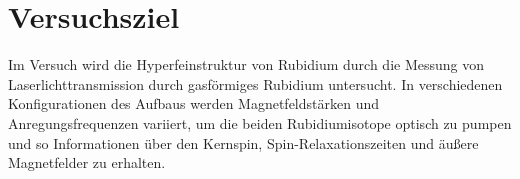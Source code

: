 \section{Versuchsziel}
Im Versuch wird die Hyperfeinstruktur von Rubidium durch die Messung von Laserlichttransmission durch
gasförmiges Rubidium untersucht.
In verschiedenen Konfigurationen des Aufbaus werden Magnetfeldstärken und Anregungsfrequenzen variiert,
um die beiden Rubidiumisotope optisch zu pumpen und so Informationen über
den Kernspin, Spin-Relaxationszeiten und äußere Magnetfelder zu erhalten.